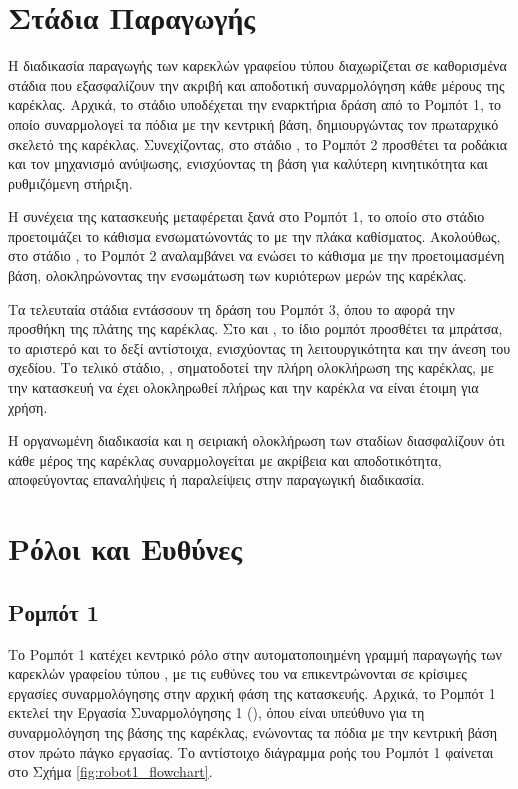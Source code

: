 \section{Στάδια Παραγωγής}
\noindent Η διαδικασία παραγωγής των καρεκλών γραφείου τύπου  διαχωρίζεται σε καθορισμένα στάδια που εξασφαλίζουν την ακριβή και αποδοτική συναρμολόγηση κάθε μέρους της καρέκλας. Αρχικά, το στάδιο \textit{} υποδέχεται την εναρκτήρια δράση από το Ρομπότ 1, το οποίο συναρμολογεί τα πόδια με την κεντρική βάση, δημιουργώντας τον πρωταρχικό σκελετό της καρέκλας. Συνεχίζοντας, στο στάδιο \textit{}, το Ρομπότ 2 προσθέτει τα ροδάκια και τον μηχανισμό ανύψωσης, ενισχύοντας τη βάση για καλύτερη κινητικότητα και ρυθμιζόμενη στήριξη.

Η συνέχεια της κατασκευής μεταφέρεται ξανά στο Ρομπότ 1, το οποίο στο στάδιο \textit{} προετοιμάζει το κάθισμα ενσωματώνοντάς το με την πλάκα καθίσματος. Ακολούθως, στο στάδιο \textit{}, το Ρομπότ 2 αναλαμβάνει να ενώσει το κάθισμα με την προετοιμασμένη βάση, ολοκληρώνοντας την ενσωμάτωση των κυριότερων μερών της καρέκλας.

Τα τελευταία στάδια εντάσσουν τη δράση του Ρομπότ 3, όπου το \textit{} αφορά την προσθήκη της πλάτης της καρέκλας. Στο \textit{} και \textit{}, το ίδιο ρομπότ προσθέτει τα μπράτσα, το αριστερό και το δεξί αντίστοιχα, ενισχύοντας τη λειτουργικότητα και την άνεση του σχεδίου. Το τελικό στάδιο, \textit{}, σηματοδοτεί την πλήρη ολοκλήρωση της καρέκλας, με την κατασκευή να έχει ολοκληρωθεί πλήρως και την καρέκλα να είναι έτοιμη για χρήση.

Η οργανωμένη διαδικασία και η σειριακή ολοκλήρωση των σταδίων διασφαλίζουν ότι κάθε μέρος της καρέκλας συναρμολογείται με ακρίβεια και αποδοτικότητα, αποφεύγοντας επαναλήψεις ή παραλείψεις στην παραγωγική διαδικασία.

\section{Ρόλοι και Ευθύνες}

\subsection{Ρομπότ 1}
\noindent Το Ρομπότ 1 κατέχει κεντρικό ρόλο στην αυτοματοποιημένη γραμμή παραγωγής των καρεκλών γραφείου τύπου , με τις ευθύνες του να επικεντρώνονται σε κρίσιμες εργασίες συναρμολόγησης στην αρχική φάση της κατασκευής. Αρχικά, το Ρομπότ 1 εκτελεί την Εργασία Συναρμολόγησης 1 (), όπου είναι υπεύθυνο για τη συναρμολόγηση της βάσης της καρέκλας, ενώνοντας τα πόδια με την κεντρική βάση στον πρώτο πάγκο εργασίας. Το αντίστοιχο διάγραμμα ροής του Ρομπότ 1 φαίνεται στο Σχήμα \ref{fig:robot1_flowchart}.

